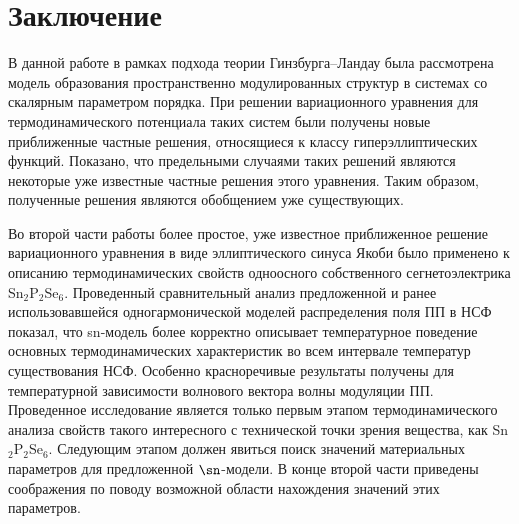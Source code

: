 
\chapter{Заключение}

В данной работе в рамках подхода теории Гинзбурга--Ландау была рассмотрена модель образования пространственно модулированных структур в системах со скалярным параметром порядка.
При решении вариационного уравнения для термодинамического потенциала таких систем были получены новые приближенные частные решения, относящиеся к классу гиперэллиптических функций.
Показано, что предельными случаями таких решений являются некоторые уже известные частные решения этого уравнения.
Таким образом, полученные решения являются обобщением уже существующих.

Во второй части работы более простое, уже известное приближенное решение вариационного уравнения в виде эллиптического синуса Якоби было применено к описанию термодинамических свойств одноосного собственного сегнетоэлектрика Sn$_2$P$_2$Se$_6$.
Проведенный сравнительный анализ предложенной и ранее использовавшейся одногармонической моделей распределения поля ПП в НСФ показал, что sn-модель более корректно описывает температурное поведение основных термодинамических характеристик во всем интервале температур существования НСФ.
Особенно красноречивые результаты получены для температурной зависимости волнового вектора волны модуляции ПП.
Проведенное исследование является только первым этапом термодинамического анализа свойств такого интересного с технической точки зрения вещества, как Sn$_2$P$_2$Se$_6$.
Следующим этапом должен явиться поиск значений материальных параметров для предложенной $\sn$-модели.
В конце второй части приведены соображения по поводу возможной области нахождения значений этих параметров.
